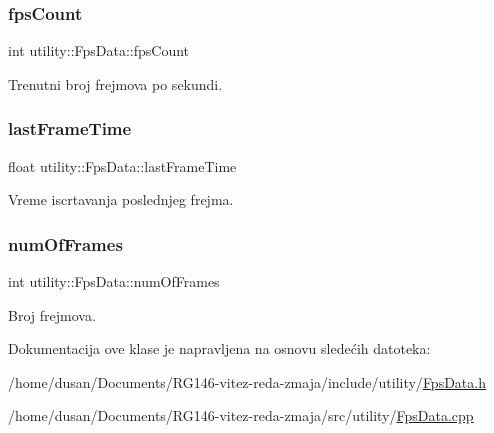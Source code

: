 \subsubsection{\texorpdfstring{fps\+Count}{fpsCount}}
{\footnotesize\ttfamily int utility\+::\+Fps\+Data\+::fps\+Count\hspace{0.3cm}{\ttfamily [private]}}



Trenutni broj frejmova po sekundi. 

\mbox{\label{classutility_1_1FpsData_a0340fb16b83e32835d5e8327b5b322e3}} 
\subsubsection{\texorpdfstring{last\+Frame\+Time}{lastFrameTime}}
{\footnotesize\ttfamily float utility\+::\+Fps\+Data\+::last\+Frame\+Time\hspace{0.3cm}{\ttfamily [private]}}



Vreme iscrtavanja poslednjeg frejma. 

\mbox{\label{classutility_1_1FpsData_acbf0bbe28e4d134e959970b252bc1bc1}} 
\subsubsection{\texorpdfstring{num\+Of\+Frames}{numOfFrames}}
{\footnotesize\ttfamily int utility\+::\+Fps\+Data\+::num\+Of\+Frames\hspace{0.3cm}{\ttfamily [private]}}



Broj frejmova. 



Dokumentacija ove klase je napravljena na osnovu sledećih datoteka\+:\begin{DoxyCompactItemize}
\item 
/home/dusan/\+Documents/\+R\+G146-\/vitez-\/reda-\/zmaja/include/utility/\hyperlink{FpsData_8h}{Fps\+Data.\+h}\item 
/home/dusan/\+Documents/\+R\+G146-\/vitez-\/reda-\/zmaja/src/utility/\hyperlink{FpsData_8cpp}{Fps\+Data.\+cpp}\end{DoxyCompactItemize}
